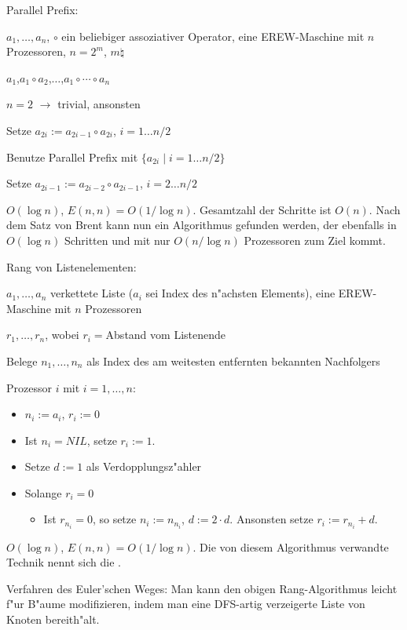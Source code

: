 \algorithm Parallel Prefix:{
  \given $a_1,\ldots,a_n$, $\circ$ ein beliebiger assoziativer Operator,
    eine EREW-Maschine mit $n$ Prozessoren, $n=2^m$, $m\natural$
  
  \aim $a_1$,$a_1\circ a_2$,$\ldots$,$a_1\circ\cdots\circ a_n$
  
  \begin{proc}
    \item $n=2$ $\rightarrow$ trivial, ansonsten
    \item Setze $a_{2i}:=a_{2i-1}\circ a_{2i}$, $i=1\ldots n/2$
    \item Benutze Parallel Prefix mit $\{a_{2i}\mid i=1\ldots n/2 \}$
    \item Setze $a_{2i-1}:=a_{2i-2}\circ a_{2i-1}$, $i=2\ldots n/2$
  \end{proc}
  
  \cpx $O(\log n)$, $E(n,n)=O(1/\log n)$. Gesamtzahl der Schritte ist 
    $O(n)$. Nach dem Satz von Brent kann nun ein Algorithmus gefunden 
    werden, der ebenfalls in $O(\log n)$ Schritten und mit nur $O(n/\log n)$ 
    Prozessoren zum Ziel kommt.
}
\algorithm Rang von Listenelementen:{
  \given $a_1,\ldots,a_n$ verkettete Liste ($a_i$ sei Index des n"achsten
    Elements), eine EREW-Maschine mit $n$ Prozessoren
    
  \aim $r_1,\ldots,r_n$, wobei $r_i=$Abstand vom Listenende
  
  \begin{proc}
    \item Belege $n_1,\ldots,n_n$ als Index des am weitesten entfernten
      bekannten Nachfolgers
    \item Prozessor $i$ mit $i=1,\ldots,n$:
      \begin{itemize}
        \item $n_i:=a_i$, $r_i:=0$
        \item Ist $n_i=NIL$, setze $r_i:=1$.
        \item Setze $d:=1$ als Verdopplungsz"ahler
        \item Solange $r_i=0$
          \begin{itemize}
            \item Ist $r_{n_i}=0$, so setze $n_i:=n_{n_i}$, $d:=2\cdot d$.
              Ansonsten setze $r_i:=r_{n_i}+d$.
          \end{itemize}
      \end{itemize}
  \end{proc}
  
  \cpx $O(\log n)$, $E(n,n)=O(1/\log n)$. Die von diesem Algorithmus 
    verwandte Technik nennt sich die .
}
\trick Verfahren des Euler'schen Weges:{
  Man kann den obigen Rang-Algorithmus leicht f"ur B"aume modifizieren, 
  indem man eine DFS-artig verzeigerte Liste von Knoten bereith"alt.
}
